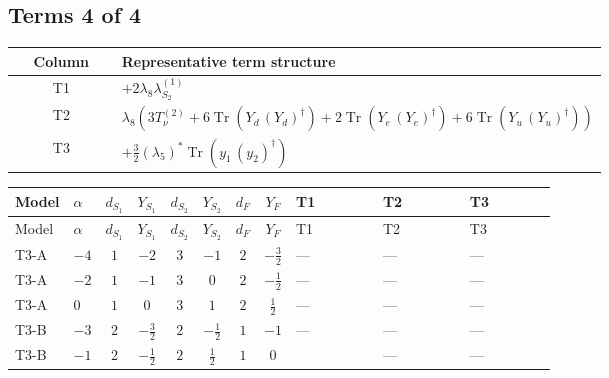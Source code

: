 \documentclass[8pt]{article}
\begin{document}
\begin{landscape}
\subsection*{Terms 4 of 4}
\begin{center}
\begin{tabular}{@{}c >{\raggedright\arraybackslash}p{0.82\linewidth}@{}}
\toprule
Column & Representative term structure \\
\midrule
T1 & \(\displaystyle +2 {\lambda_{8}} {\lambda_{S_2}^{(1)}}\) \\
\midrule
T2 & \(\displaystyle {\lambda_{8}} (3 T_{\nu}^{(2)}+6 \operatorname{Tr}\!\left({Y_d}\,\left({Y_d}\right)^{\dagger}\right)+2 \operatorname{Tr}\!\left({Y_e}\,\left({Y_e}\right)^{\dagger}\right)+6 \operatorname{Tr}\!\left({Y_u}\,\left({Y_u}\right)^{\dagger}\right))\) \\
\midrule
T3 & \(\displaystyle +\frac{3}{2} \left({\lambda_5}\right)^{*} \operatorname{Tr}\!\left({y_1}\,\left({y_2}\right)^{\dagger}\right)\) \\
\midrule
\bottomrule
\end{tabular}
\end{center}
\smallskip
\tiny
\begin{longtable}{@{}llcccccc >{\raggedright\arraybackslash}p{0.21\linewidth} >{\raggedright\arraybackslash}p{0.21\linewidth} >{\raggedright\arraybackslash}p{0.21\linewidth}@{}}
\toprule
Model & $\alpha$ & $d_{S_1}$ & $Y_{S_1}$ & $d_{S_2}$ & $Y_{S_2}$ & $d_F$ & $Y_F$ & T1 & T2 & T3 \\
\midrule
\endfirsthead
\toprule
Model & $\alpha$ & $d_{S_1}$ & $Y_{S_1}$ & $d_{S_2}$ & $Y_{S_2}$ & $d_F$ & $Y_F$ & T1 & T2 & T3 \\
\midrule
\endhead
T3-A & $-4$ & $1$ & $-2$ & $3$ & $-1$ & $2$ & $-\frac{3}{2}$ & --- & --- & --- \\
\midrule
T3-A & $-2$ & $1$ & $-1$ & $3$ & $0$ & $2$ & $-\frac{1}{2}$ & --- & --- & --- \\
\midrule
T3-A & $0$ & $1$ & $0$ & $3$ & $1$ & $2$ & $\frac{1}{2}$ & --- & --- & --- \\
\midrule
T3-B & $-3$ & $2$ & $-\frac{3}{2}$ & $2$ & $-\frac{1}{2}$ & $1$ & $-1$ & --- & --- & --- \\
\midrule
T3-B & $-1$ & $2$ & $-\frac{1}{2}$ & $2$ & $\frac{1}{2}$ & $1$ & $0$ & \scriptsize\adjustbox{max width=\linewidth}{$\begin{gathered} +2 {\lambda_{8}} {\lambda_{S_2}^{(1)}}\end{gathered}$} & --- & --- \\

\end{longtable}
\end{landscape}
\end{document}
